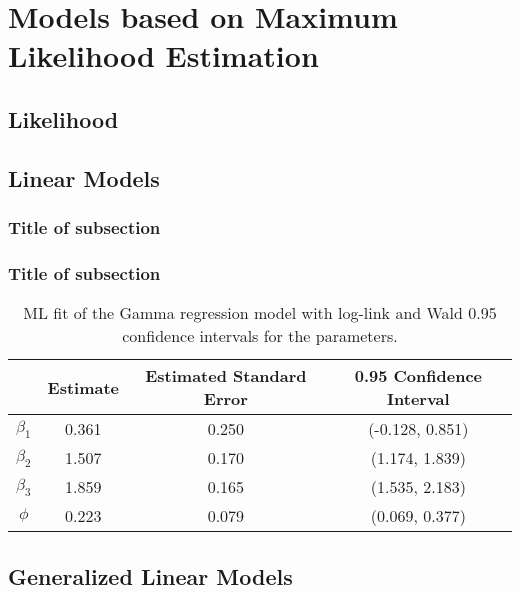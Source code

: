 \chapter{ Models based on Maximum Likelihood Estimation}

\fancyhead[RO,LE]{\thepage}

\setlength{\parskip}{0.5pt}

\bigskip

\section{Likelihood} 
\noindent

\section{Linear Models}
\noindent

\subsection{}
\noindent


\subsection{Title of subsection}
\noindent


\subsection{Title of subsection}
\noindent

\begin{table}[b]\centering\vspace{0.5cm}
	\caption{\label{tab:MLfit} ML fit of the Gamma regression model with log-link and Wald 0.95 confidence intervals for the parameters.}
	\medskip	
	\begin{tabular}{cccc}
		\toprule
		& Estimate & Estimated Standard Error & 0.95 Confidence Interval \\
		\midrule
		$\beta_1$ & 0.361 & 0.250 & (-0.128,  0.851) \\ 
		
		$\beta_2$ & 1.507 & 0.170 & (1.174, 1.839)\\
		
		$\beta_3$ & 1.859 & 0.165 & (1.535, 2.183)\\
		
		$\phi$ & 0.223 & 0.079 & (0.069, 0.377)\\
		\bottomrule
	\end{tabular}
\end{table}

\section{Generalized Linear Models}
\noindent

